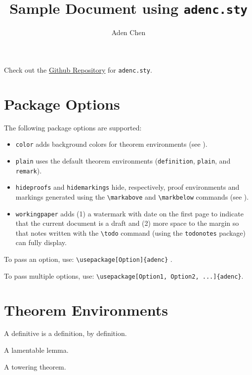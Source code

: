 \documentclass[10pt,oneside,letterpaper]{amsart}
\title{Sample Document using \texttt{adenc.sty}}
\author{Aden Chen}
\begin{document}
\maketitle

\tableofcontents

Check out the \href{https://github.com/AdenChen27/latex}{Github Repository} for \texttt{adenc.sty}. 


\section{Package Options}
The following package options are supported:
\begin{itemize}
  \item \verb|color| adds background colors for theorem environments (see ). 
  \item \verb|plain| uses the default theorem environments (\texttt{definition}, \texttt{plain}, and \texttt{remark}).
  \item \verb|hideproofs| and \verb|hidemarkings| hide, respectively, proof environments and markings generated using the \verb|\markabove| and \verb|\markbelow| commands (see ). 
  \item \verb|workingpaper| adds (1) a watermark with date on the first page to indicate that the current document is a draft and (2) more space to the margin so that notes written with the \verb|\todo| command (using the \verb|todonotes| package) can fully display. 
\end{itemize}

To pass an option, use: \verb|\usepackage[Option]{adenc}| . 

To pass multiple options, use: \verb|\usepackage[Option1, Option2, ...]{adenc}|. 


\section{Theorem Environments}
\label{sec:thm-env}

\begin{definition}
  A definitive  is a definition, by definition. 
\end{definition}

\begin{lemma}
  A lamentable lemma. 
\end{lemma}

\begin{theorem}
  A towering theorem. 
\end{theorem}
\end{document}
